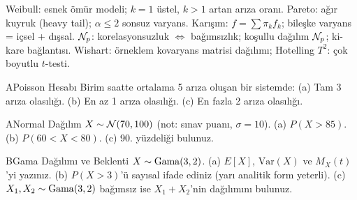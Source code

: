 \begin{mikroozet}
Weibull: esnek ömür modeli; $k=1$ üstel, $k>1$ artan arıza oranı.
Pareto: ağır kuyruk (heavy tail); $\alpha \leq 2$ sonsuz varyans.
Karışım: $f = \sum\pi_k f_k$; bileşke varyans = içsel + dışsal.
$\mathcal{N}_p$: korelasyonsuzluk $\iff$ bağımsızlık; koşullu dağılım $\mathcal{N}_p$; ki-kare bağlantısı.
Wishart: örneklem kovaryans matrisi dağılımı; Hotelling $T^2$: çok boyutlu $t$-testi.
\end{mikroozet}


\cozumlualistirmalar

\begin{alistirma}[Al.5.1]{A}{Poisson Hesabı}
Birim saatte ortalama 5 arıza oluşan bir sistemde:
(a) Tam 3 arıza olasılığı. (b) En az 1 arıza olasılığı. (c) En fazla 2 arıza olasılığı.
\end{alistirma}

\begin{alistirma}[Al.5.2]{A}{Normal Dağılım}
$X \sim \mathcal{N}(70, 100)$ (not: sınav puanı, $\sigma = 10$).
(a) $P(X > 85)$. (b) $P(60 < X < 80)$. (c) 90. yüzdeliği bulunuz.
\end{alistirma}

\begin{alistirma}[Al.5.3]{B}{Gama Dağılımı ve Beklenti}
$X \sim \operatorname{Gama}(3, 2)$.
(a) $E[X]$, $\mathrm{Var}(X)$ ve $M_X(t)$'yi yazınız.
(b) $P(X > 3)$'ü sayısal ifade ediniz (yarı analitik form yeterli).
(c) $X_1, X_2 \sim \operatorname{Gama}(3, 2)$ bağımsız ise $X_1 + X_2$'nin dağılımını bulunuz.
\end{alistirma}

